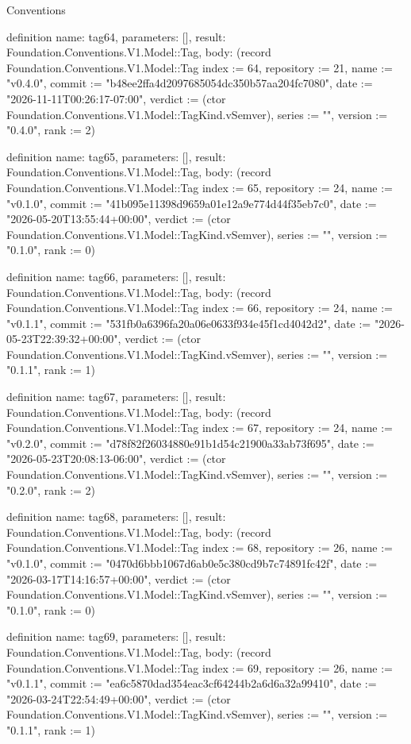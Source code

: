 \begin{lexlean}{Conventions}
\begin{semanticmodule}
definition{
  name: tag64,
  parameters: [],
  result: Foundation.Conventions.V1.Model::Tag,
  body: (record Foundation.Conventions.V1.Model::Tag {index := 64, repository := 21, name := "v0.4.0", commit := "b48ee2ffa4d2097685054dc350b57aa204fc7080", date := "2026-11-11T00:26:17-07:00", verdict := (ctor Foundation.Conventions.V1.Model::TagKind.vSemver), series := "", version := "0.4.0", rank := 2})
}

definition{
  name: tag65,
  parameters: [],
  result: Foundation.Conventions.V1.Model::Tag,
  body: (record Foundation.Conventions.V1.Model::Tag {index := 65, repository := 24, name := "v0.1.0", commit := "41b095e11398d9659a01e12a9e774d44f35eb7c0", date := "2026-05-20T13:55:44+00:00", verdict := (ctor Foundation.Conventions.V1.Model::TagKind.vSemver), series := "", version := "0.1.0", rank := 0})
}

definition{
  name: tag66,
  parameters: [],
  result: Foundation.Conventions.V1.Model::Tag,
  body: (record Foundation.Conventions.V1.Model::Tag {index := 66, repository := 24, name := "v0.1.1", commit := "531fb0a6396fa20a06e0633f934e45f1cd4042d2", date := "2026-05-23T22:39:32+00:00", verdict := (ctor Foundation.Conventions.V1.Model::TagKind.vSemver), series := "", version := "0.1.1", rank := 1})
}

definition{
  name: tag67,
  parameters: [],
  result: Foundation.Conventions.V1.Model::Tag,
  body: (record Foundation.Conventions.V1.Model::Tag {index := 67, repository := 24, name := "v0.2.0", commit := "d78f82f26034880e91b1d54c21900a33ab73f695", date := "2026-05-23T20:08:13-06:00", verdict := (ctor Foundation.Conventions.V1.Model::TagKind.vSemver), series := "", version := "0.2.0", rank := 2})
}

definition{
  name: tag68,
  parameters: [],
  result: Foundation.Conventions.V1.Model::Tag,
  body: (record Foundation.Conventions.V1.Model::Tag {index := 68, repository := 26, name := "v0.1.0", commit := "0470d6bbb1067d6ab0e5c380cd9b7c74891fc42f", date := "2026-03-17T14:16:57+00:00", verdict := (ctor Foundation.Conventions.V1.Model::TagKind.vSemver), series := "", version := "0.1.0", rank := 0})
}

definition{
  name: tag69,
  parameters: [],
  result: Foundation.Conventions.V1.Model::Tag,
  body: (record Foundation.Conventions.V1.Model::Tag {index := 69, repository := 26, name := "v0.1.1", commit := "ea6c5870dad354eac3cf64244b2a6d6a32a99410", date := "2026-03-24T22:54:49+00:00", verdict := (ctor Foundation.Conventions.V1.Model::TagKind.vSemver), series := "", version := "0.1.1", rank := 1})
}


\end{semanticmodule}
\end{lexlean}

